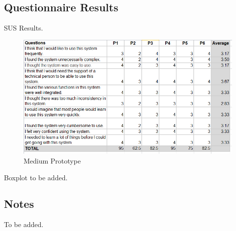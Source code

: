 \documentclass[a4 paper, 12pt]{article}
\begin{document}
    \pagebreak    
    \subsection{Questionnaire Results}
    \label{sec:B.7} 
    SUS Results.
        \begin{figure} [H]
            \centering
            \includegraphics[width=\textwidth, frame]
                {./Med_Fidelity/Med_Report/images/SUS_table.PNG}  
            \caption{Medium Prototype}
        \end{figure}
    Boxplot to be added.

    \pagebreak  
    \subsection{Notes}     
    \label{sec:B.8}     
    To be added.
\end{document}
